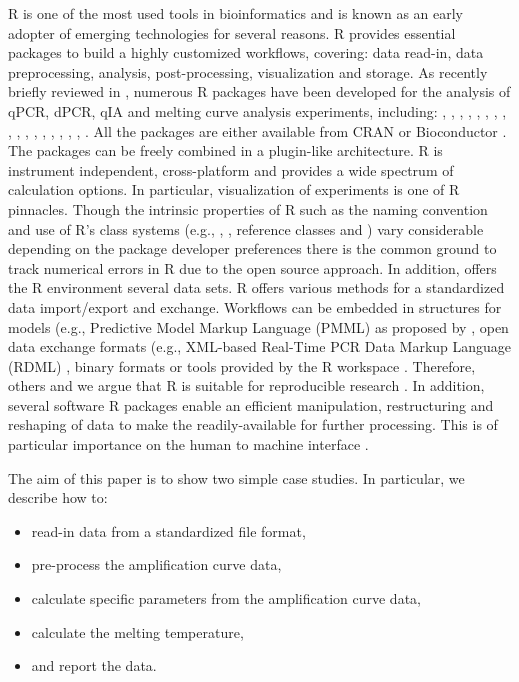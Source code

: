 R is one of the most used tools in bioinformatics and is known as an early 
adopter of emerging technologies \citep{pabinger_2014} for several reasons. R 
provides essential packages to build a highly customized workflows, covering: 
data read-in, data preprocessing, analysis, post-processing, visualization and 
storage. As recently briefly reviewed in \citet{pabinger_2014}, numerous R 
packages have been developed for the analysis of qPCR, dPCR, qIA and melting 
curve analysis experiments, including: , , 
, , , , 
, , , , 
, , , , 
, , , 
. All the packages are either available from CRAN or 
Bioconductor \citep{gentleman_2004}. The packages can be freely combined in a 
plugin-like architecture. R is instrument independent, cross-platform and 
provides a wide spectrum of calculation options. In particular, visualization of 
experiments is one of R pinnacles. Though the intrinsic properties of R such as 
the naming convention \citep{Baaaath_2012} and use of R's class systems (e.g., 
, , reference classes and ) vary considerable 
depending on the package developer preferences there is the common ground to 
track numerical errors in R due to the open source approach. In addition, offers 
the R environment several data sets. R offers various methods for a standardized 
data import/export and exchange. Workflows can be embedded in structures for 
models (e.g., Predictive Model Markup Language (PMML) as proposed by 
\citet{Guazzelli_2009}, open data exchange formats (e.g., XML-based Real-Time 
PCR Data Markup Language (RDML) \citep{lefever_2009}, binary formats 
\citep{michna_2013} or tools provided by the R workspace \citep{RDCT2010c}. 
Therefore, others and we argue that R is suitable for reproducible research 
\citep{Gesmann_2011, Murrell_2012, gandrud_2013, hofmann_2013, Leeper_2014, 
liu_2014}. In addition, several software R packages enable an efficient 
manipulation, restructuring and reshaping of data to make the readily-available 
for further processing. This is of particular importance on the human to machine 
interface \citep{Oh_2014}.

The aim of this paper is to show two simple case studies. In 
particular, we describe how to:
\begin{itemize}
 \item read-in data from a standardized file format,
 \item pre-process the amplification curve data,
 \item calculate specific parameters from the amplification curve data,
 \item calculate the melting temperature,
 \item and report the data.
\end{itemize}

